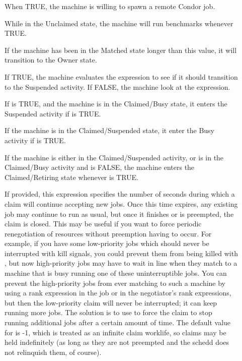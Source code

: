 \begin{description}
  
\item[] When TRUE, the machine is willing to spawn
  a remote Condor job.
  
\item[] While in the Unclaimed state, the machine
  will run benchmarks whenever TRUE.
  
\item[] If the machine has been in the Matched
  state longer than this value, it will transition to the Owner state.
  
\item[] If TRUE, the machine evaluates
  the  expression to see if it should transition to the
  Suspended activity.  If FALSE, the machine look at
  the  expression.
  
\item[] If  is TRUE, and the machine
  is in the Claimed/Busy state, it enters the Suspended activity
  if  is TRUE.
  
\item[] If the machine is in the Claimed/Suspended
  state, it enter the Busy activity if  is TRUE.
  
\item[] If the machine is either in the Claimed/Suspended
  activity, or is in the Claimed/Busy activity and
   is FALSE, the machine enters the Claimed/Retiring
  state whenever  is TRUE. 

\item[] If provided, this expression specifies
the number of seconds during which a claim will continue accepting new
jobs.  Once this time expires, any existing job may continue to run as
usual, but once it finishes or is preempted, the claim is closed.
This may be useful if you want to force periodic renegotiation of
resources without preemption having to occur.  For example, if you
have some low-priority jobs which should never be interrupted with
kill signals, you could prevent them from being killed with
, but now high-priority jobs may have to
wait in line when they match to a machine that is busy running one of
these uninterruptible jobs.  You can prevent the high-priority jobs
from ever matching to such a machine by using a rank expression in the
job or in the negotiator's rank expressions, but then the low-priority
claim will never be interrupted; it can keep running more jobs.  The
solution is to use  to force the claim to stop
running additional jobs after a certain amount of time.
The default value for  is -1, which is treated
as an infinite claim worklife, so claims may be held indefinitely (as
long as they are not preempted and the schedd does not relinquish
them, of course).


\end{description}
